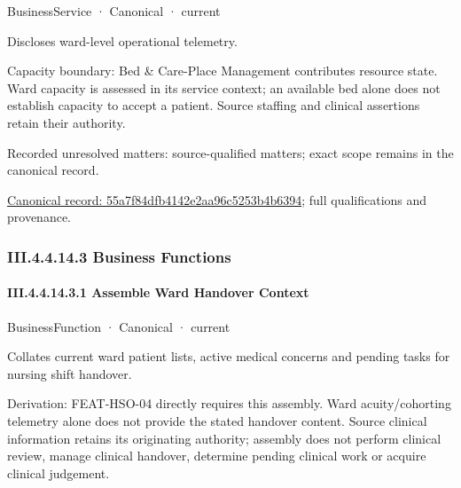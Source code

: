 \label{element:55a7f84dfb4142e2aa96c5253b4b6394}
{\small BusinessService · Canonical · current}\par

Discloses ward-level operational telemetry.



Capacity boundary: Bed \& Care-Place Management contributes resource state. Ward capacity is assessed in its service context; an available bed alone does not establish capacity to accept a patient. Source staffing and clinical assertions retain their authority.


{\small Recorded unresolved matters: source-qualified matters; exact scope remains in the canonical record.}\par
{\footnotesize \href{../../../../../../../continuum/business/business-service/55a7f84dfb4142e2aa96c5253b4b6394.md}{Canonical record: 55a7f84dfb4142e2aa96c5253b4b6394}; full qualifications and provenance.}\par
\subsubsection*{III.4.4.14.3 Business Functions}
\label{navigation:III.4.4.14.3}

\paragraph*{III.4.4.14.3.1 Assemble Ward Handover Context}
\label{navigation:III.4.4.14.3.1}

\label{element:6006d70ed3794c57ab2bc57119292e4b}
{\small BusinessFunction · Canonical · current}\par

Collates current ward patient lists, active medical concerns and pending tasks for nursing shift handover.



Derivation: FEAT-HSO-04 directly requires this assembly. Ward acuity/cohorting telemetry alone does not provide the stated handover content. Source clinical information retains its originating authority; assembly does not perform clinical review, manage clinical handover, determine pending clinical work or acquire clinical judgement.


